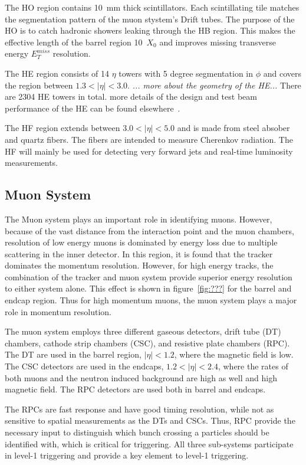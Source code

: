 The HO region contains 10~mm thick scintillators.  Each scintillating tile
matches the segmentation pattern of the muon stystem's Drift tubes.  
The purpose of the HO is to catch hadronic showers leaking through the 
HB region. This makes the effective length of the barrel region 10~$X_0$
and improves missing transverse energy $E_T^{miss}$ resolution.

The HE region consists of 14 $\eta$ towers with 5 degree segmentation in 
$\phi$ and covers the region between $1.3<|\eta|<3.0$. {\it ... more about the
geometry of the HE...} There are 2304 HE towers in total.  more details of
the design and test beam performance of the HE can be found 
elsewhere~\cite{??}.

The HF region extends between $3.0<|\eta|<5.0$ and is made from steel absober
and quartz fibers.  The fibers are intended to measure Cherenkov radiation.  
The HF will mainly be used for detecting very forward jets and real-time
luminosity measurements.  

\subsection{Muon System}
\label{sec:Muon System}

The Muon system plays an important role in identifying muons.  However, 
because of the vast distance from the interaction point and the muon 
chambers, resolution of low energy muons is dominated by energy loss 
due to multiple scattering in the inner detector.  In this region, it 
is found that the tracker dominates the momentum resolution.  However, 
for high energy tracks, the combination of the tracker and muon system
provide superior energy resolution to either system alone.  This effect
is shown in figure~\ref{fig:???} for the barrel and endcap region.  Thus
for high momentum muons, the muon system plays a major role in momentum 
resolution. 

The muon system employs three different gaseous detectors, drift tube (DT)
chambers, cathode strip chambers (CSC), and resistive plate chambers (RPC).
The DT are used in the barrel region, $|\eta|<1.2$, where the magnetic 
field is low.  The CSC detectors are used in the endcaps, 
$1.2<|\eta|<2.4$, where the rates of both muons and the neutron induced
background are high as well and high magnetic field.  The RPC detectors
are used both in barrel and endcaps.  

The RPCs are fast response and have
good timing resolution, while not as sensitive to spatial measurements
as the DTs and CSCs.  Thus, RPC provide the necessary input to distinguish
which bunch crossing a particles should be identified with, which is critical
for triggering.  All three sub-systems participate in level-1 triggering
and provide a key element to level-1 triggering.

